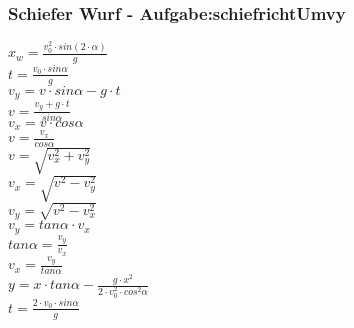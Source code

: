 \subsubsection{Schiefer Wurf  - Aufgabe:schiefrichtUmvy} 
\begin{minipage}{0.45\textwidth} 
$ x_{w}  = \frac{v_{0} ^{2} \cdot sin(2\cdot \alpha )}{       g} $\\ 
$ t =\frac{v_{0} \cdot sin \alpha }{  g} $\\ 
$ v_{y}  =  v\cdot sin\alpha - g\cdot t $\\ 
$ v= \frac{ v_{y} +g\cdot t}{ sin\alpha } $\\ 
$ v_{x}  = v\cdot  cos\alpha $\\ 
$ v= \frac{ v_{x} }{ cos\alpha } $\\ 
$ v= \sqrt{ v_{x} ^{2} + v_{y} ^{2} } $\\ 
$ v_{x} = \sqrt{ v^{2}  - v_{y} ^{2} } $\\ 
$ v_{y} = \sqrt{ v^{2}  - v_{x} ^{2} } $\\ 
$ v_{y} = tan \alpha \cdot  v_{x} $\\ 
$ tan \alpha = \frac{v_{y} }{v_{x} } $\\ 
$ v_{x} = \frac{v_{y} }{tan \alpha } $\\ 
$ y = x\cdot tan \alpha  - \frac{   g\cdot x^{2} }{2\cdot v^{2} _{0} \cdot cos ^{2}\alpha } $\\ 
$ t =\frac{2\cdot v_{0} \cdot sin \alpha }{ g} $\\ 
\end{minipage} 
\begin{minipage}{0.45\textwidth} 
 
\end{minipage} 
